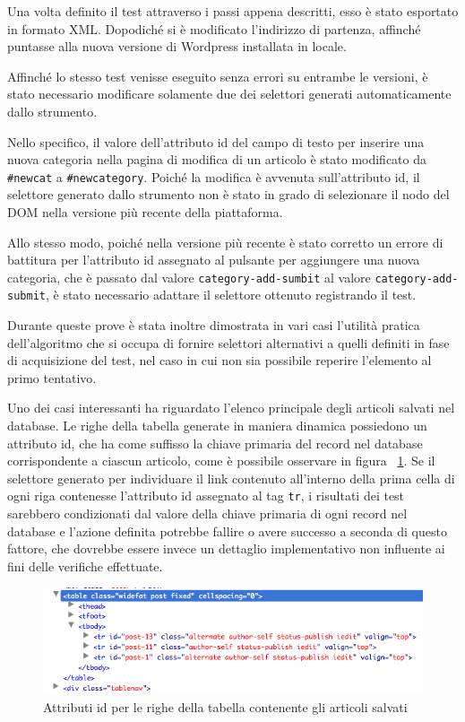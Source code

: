 Una volta definito il test attraverso i passi appena descritti, esso è stato esportato in formato XML. Dopodiché si è modificato l'indirizzo di partenza, affinché puntasse alla nuova versione di Wordpress installata in locale.

Affinché lo stesso test venisse eseguito senza errori su entrambe le versioni, è stato necessario modificare solamente due dei selettori generati automaticamente dallo strumento.

Nello specifico, il valore dell'attributo id del campo di testo per inserire una nuova categoria nella pagina di modifica di un articolo è stato modificato da \verb|#newcat| a \verb|#newcategory|. Poiché la modifica è avvenuta sull'attributo id, il selettore generato dallo strumento non è stato in grado di selezionare il nodo del DOM nella versione più recente della piattaforma.

Allo stesso modo, poiché nella versione più recente è stato corretto un errore di battitura per l'attributo id assegnato al pulsante per aggiungere una nuova categoria, che è passato dal valore \verb|category-add-sumbit| al valore \verb|category-add-submit|, è stato necessario adattare il selettore ottenuto registrando il test.

Durante queste prove è stata inoltre dimostrata in vari casi l'utilità pratica dell'algoritmo che si occupa di fornire selettori alternativi a quelli definiti in fase di acquisizione del test, nel caso in cui non sia possibile reperire l'elemento al primo tentativo.

Uno dei casi interessanti ha riguardato l'elenco principale degli articoli salvati nel database. Le righe della tabella generate in maniera dinamica possiedono un attributo id, che ha come suffisso la chiave primaria del record nel database corrispondente a ciascun articolo, come è possibile osservare in figura ~\ref{fig:trId}. Se il selettore generato per individuare il link contenuto all'interno della prima cella di ogni riga contenesse l'attributo id assegnato al tag \verb|tr|, i risultati dei test sarebbero condizionati dal valore della chiave primaria di ogni record nel database e l'azione definita potrebbe fallire o avere successo a seconda di questo fattore, che dovrebbe essere invece un dettaglio implementativo non influente ai fini delle verifiche effettuate.

\begin{figure}[htbp]
\begin{center}
\includegraphics[width=\textwidth]{images/wp_tour/10_firebug_tr_id.png}
\caption{Attributi id per le righe della tabella contenente gli articoli salvati}
\label{fig:trId}
\end{center}
\end{figure}

